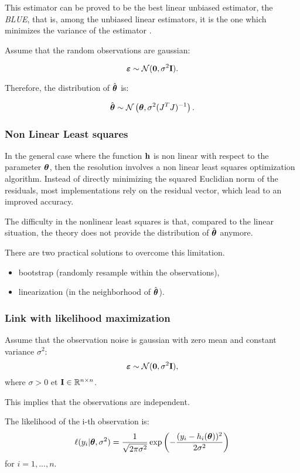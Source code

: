 \documentclass{beamer}
\begin{document}

\begin{frame}
This estimator can be proved to be the best linear unbiased estimator,
the \emph{BLUE}, that is, among the unbiased linear estimators, it is the one
which minimizes the variance of the estimator \cite{BinghamFry, Sen1990}.

Assume that the random observations are gaussian:

$$
\boldsymbol{\varepsilon} \sim \mathcal{N}(\boldsymbol{0},\sigma^2 {\bf I}).
$$

Therefore, the distribution of $\hat{\boldsymbol{\theta}}$ is:

$$
\hat{\boldsymbol{\theta}} \sim \mathcal{N} \left(\boldsymbol{\theta},\sigma^2 (J^T J)^{-1} \right).
$$


\end{frame}


\begin{frame}
\frametitle{Non Linear Least squares}

In the general case where the function ${\bf h}$ is non linear
with respect to the parameter $\boldsymbol{\theta}$, then the resolution
involves a non linear least squares optimization algorithm. Instead of
directly minimizing the squared Euclidian norm of the residuals, most
implementations rely on the residual vector, which lead to an improved
accuracy.

The difficulty in the nonlinear least squares is that, compared to the
linear situation, the theory does not provide the distribution of
$\hat{\boldsymbol{\theta}}$ anymore.

There are two practical solutions to overcome this limitation.
\begin{itemize}
\item bootstrap (randomly resample within the observations),
\item linearization (in the neighborhood of $\hat{\boldsymbol{\theta}}$).
\end{itemize}

\end{frame}


\begin{frame}
\frametitle{Link with likelihood maximization}
Assume that the observation noise is gaussian with zero mean and constant 
variance $\sigma^2$: 
$$
\boldsymbol{\varepsilon} \sim \mathcal{N}({\bf 0},\sigma^2 {\bf I}),
$$ 
where $\sigma>0$ et ${\bf I}\in\mathbb{R}^{n\times n}$. 

This implies that the observations are independent. 

The likelihood of the i-th observation is:
$$
\ell(y_i|\boldsymbol{\theta},\sigma^2) = 
\frac{1}{\sqrt{2\pi \sigma^2}} 
\exp\left(-\frac{(y_i - h_i(\boldsymbol{\theta}))^2}{2 \sigma^2}\right)
$$
for $i=1,...,n$. 
\end{frame}
\end{document}

